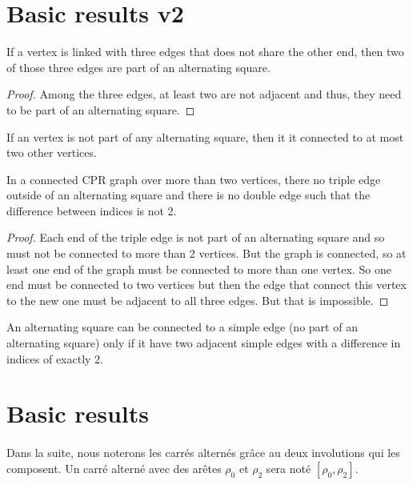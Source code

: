 \section{Basic results v2}

\begin{proposition}
  If a vertex is linked with three edges that does not share the other end, then two of those three edges are part of an alternating square.
\end{proposition}

\begin{proof}
  Among the three edges, at least two are not adjacent and thus, they need to be part of an alternating square.
\end{proof}

\begin{corollary}
  If an vertex is not part of any alternating square, then it it connected to at most two other vertices.
\end{corollary}

\begin{proposition}
  In a connected CPR graph over more than two vertices, there no triple edge outside of an alternating square and there is no double edge such that the difference between indices is not 2.
\end{proposition}

\begin{proof}
  Each end of the triple edge is not part of an alternating square and so must not be connected to more than 2 vertices. But the graph is connected, so at least one end of the graph must be connected to more than one vertex. So one end must be connected to two vertices but then the edge that connect this vertex to the new one must be adjacent to all three edges. But that is impossible.
\end{proof}

\begin{proposition}
  An alternating square can be connected to a simple edge (no part of an alternating square) only if it have two adjacent simple edges with a difference in indices of exactly 2.
\end{proposition}



\section{Basic results}

\paragraph{}
Dans la suite, nous noterons les carrés alternés grâce au deux involutions qui les composent. Un carré alterné avec des arêtes $\rho_0$ et $\rho_2$ sera noté $[\rho_0, \rho_2]$.

